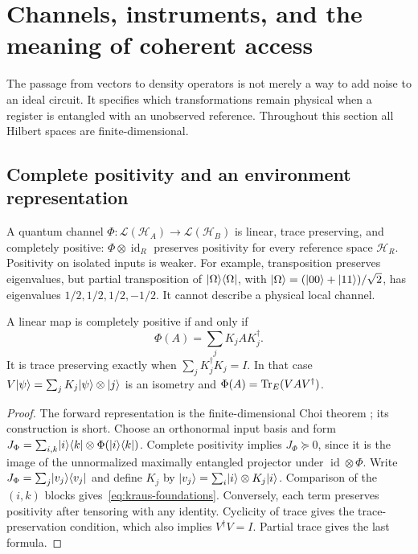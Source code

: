 \section{Channels, instruments, and the meaning of coherent access}
\label{sec:channels-foundations}
The passage from vectors to density operators is not merely a way to add
noise to an ideal circuit. It specifies which transformations remain
physical when a register is entangled with an unobserved reference.
Throughout this section all Hilbert spaces are finite-dimensional.

\subsection{Complete positivity and an environment representation}
A quantum channel $\Phi:\mathcal L(\mathcal H_A)\to
\mathcal L(\mathcal H_B)$ is linear, trace preserving, and completely
positive: $\Phi\otimes\operatorname{id}_R$ preserves positivity for
every reference space $\mathcal H_R$. Positivity on isolated inputs is
weaker. For example, transposition preserves eigenvalues, but partial
transposition of $\lvert \Omega\rangle\langle \Omega\rvert$, with
$\lvert \Omega\rangle=(\lvert 00\rangle+\lvert 11\rangle)/\sqrt2$, has eigenvalues
$1/2,1/2,1/2,-1/2$. It cannot describe a physical local channel.

\begin{theorem}\label{thm:kraus-foundations}
A linear map is completely positive if and only if
\begin{equation}\label{eq:kraus-foundations}
 \Phi(A)=\sum_j K_j A K_j^\dagger.
\end{equation}
It is trace preserving exactly when $\sum_jK_j^\dagger K_j=I$.
In that case $V\lvert \psi\rangle=\sum_jK_j\lvert \psi\rangle\otimes\lvert j\rangle$ is an
isometry and $\Phi(A)=\operatorname{Tr}_E(VAV^\dagger)$.
\end{theorem}
\begin{proof}
The forward representation is the finite-dimensional Choi theorem
\citep{choi1975}; its construction is short. Choose an orthonormal input
basis and form
$J_\Phi=\sum_{i,k}\lvert i\rangle\langle k\rvert\otimes\Phi(\lvert i\rangle\langle k\rvert)$.
Complete positivity implies $J_\Phi\succeq0$, since it is the image
of the unnormalized maximally entangled projector under
$\operatorname{id}\otimes\Phi$. Write
$J_\Phi=\sum_j\lvert v_j\rangle\langle v_j\rvert$ and define $K_j$ by
$\lvert v_j\rangle=\sum_i\lvert i\rangle\otimes K_j\lvert i\rangle$.
Comparison of the $(i,k)$ blocks gives~\eqref{eq:kraus-foundations}.
Conversely, each term preserves positivity after tensoring with any
identity. Cyclicity of trace gives the trace-preservation condition,
which also implies $V^\dagger V=I$. Partial trace gives the last formula.
\end{proof}

